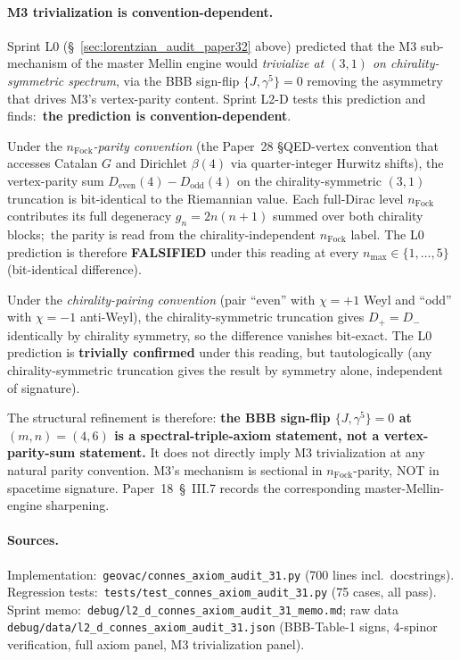 \documentclass[11pt]{article}
\begin{document}
\paragraph{M3 trivialization is convention-dependent.}
Sprint L0 (\S~\ref{sec:lorentzian_audit_paper32} above) predicted that
the M3 sub-mechanism of the master Mellin engine would
\emph{trivialize at $(3, 1)$ on chirality-symmetric spectrum}, via the
BBB sign-flip $\{J, \gamma^5\} = 0$ removing the asymmetry that drives
M3's vertex-parity content.  Sprint L2-D tests this prediction and
finds:\ \textbf{the prediction is convention-dependent}.

Under the \emph{$n_{\mathrm{Fock}}$-parity convention} (the Paper~28
\S QED-vertex convention that accesses Catalan $G$ and Dirichlet
$\beta(4)$ via quarter-integer Hurwitz shifts), the vertex-parity sum
$D_{\mathrm{even}}(4) - D_{\mathrm{odd}}(4)$ on the chirality-symmetric
$(3, 1)$ truncation is bit-identical to the Riemannian value.  Each
full-Dirac level $n_{\mathrm{Fock}}$ contributes its full degeneracy
$g_n = 2 n (n+1)$ summed over both chirality blocks;\ the parity is
read from the chirality-independent $n_{\mathrm{Fock}}$ label.
The L0 prediction is therefore \textbf{FALSIFIED} under this reading
at every $n_{\max} \in \{1, \ldots, 5\}$ (bit-identical difference).

Under the \emph{chirality-pairing convention} (pair ``even'' with
$\chi = +1$ Weyl and ``odd'' with $\chi = -1$ anti-Weyl), the
chirality-symmetric truncation gives $D_+ = D_-$ identically by
chirality symmetry, so the difference vanishes bit-exact.  The L0
prediction is \textbf{trivially confirmed} under this reading, but
tautologically (any chirality-symmetric truncation gives the result
by symmetry alone, independent of signature).

The structural refinement is therefore: \textbf{the BBB sign-flip
$\{J, \gamma^5\} = 0$ at $(m, n) = (4, 6)$ is a spectral-triple-axiom
statement, not a vertex-parity-sum statement.}  It does not directly
imply M3 trivialization at any natural parity convention.
M3's mechanism is sectional in $n_{\mathrm{Fock}}$-parity, NOT in
spacetime signature.  Paper~18~\S~III.7 records the corresponding
master-Mellin-engine sharpening.

\paragraph{Sources.}
Implementation:\ \verb|geovac/connes_axiom_audit_31.py| (700 lines
incl.\ docstrings).  Regression tests:\
\verb|tests/test_connes_axiom_audit_31.py| (75 cases, all pass).
Sprint memo:\ \verb|debug/l2_d_connes_axiom_audit_31_memo.md|; raw data
\verb|debug/data/l2_d_connes_axiom_audit_31.json| (BBB-Table-1 signs,
4-spinor verification, full axiom panel, M3 trivialization panel).
\end{document}
